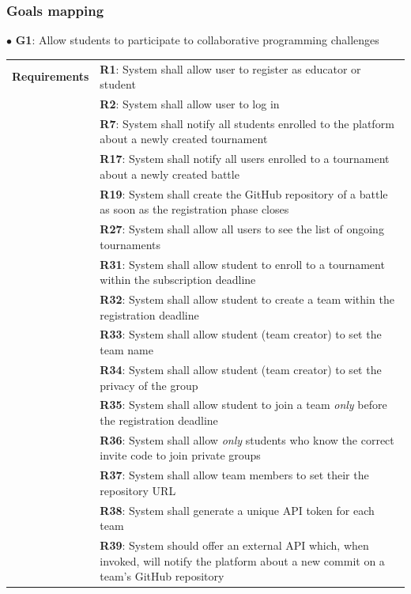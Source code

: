 \subsubsection{Goals mapping}
$\bullet$ \textbf{G1}: Allow students to participate to collaborative programming challenges
\begin{center}
    \begin{tabular}{ |m{3cm}|m{10cm}| }
        \hline
        \textbf{Requirements} 
        & \textbf{R1}: System shall allow user to register as educator or student \\
        & \textbf{R2}: System shall allow user to log in \\
        & \textbf{R7}: System shall notify all students enrolled to the platform about a newly created tournament \\
        & \textbf{R17}: System shall notify all users enrolled to a tournament about a newly created battle \\
        & \textbf{R19}: System shall create the GitHub repository of a battle as soon as the registration phase closes \\
        & \textbf{R27}: System shall allow all users to see the list of ongoing tournaments \\
        & \textbf{R31}: System shall allow student to enroll to a tournament within the subscription deadline \\
        & \textbf{R32}: System shall allow student to create a team within the registration deadline \\
        & \textbf{R33}: System shall allow student (team creator) to set the team name \\
        & \textbf{R34}: System shall allow student (team creator) to set the privacy of the group \\
        & \textbf{R35}: System shall allow student to join a team \textit{only} before the registration deadline \\
        & \textbf{R36}: System shall allow \textit{only} students who know the correct invite code to join private groups \\
        & \textbf{R37}: System shall allow team members to set their the repository URL \\
        & \textbf{R38}: System shall generate a unique API token for each team \\
        & \textbf{R39}: System should offer an external API which, when invoked, will notify the platform about a new commit on a team’s GitHub repository \\

\end{tabular}
\end{center}
